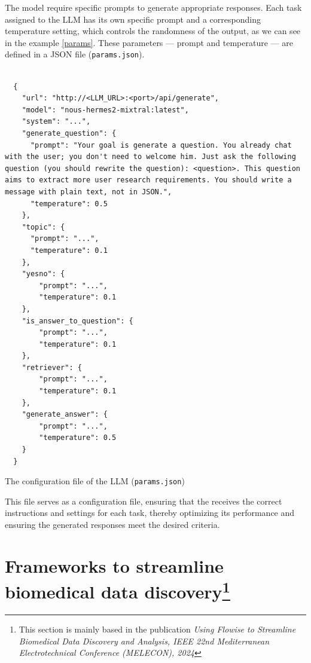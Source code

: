
The model require specific prompts to generate appropriate responses. Each task assigned to the LLM has its own specific prompt and a corresponding temperature setting, which controls the randomness of the output, as we can see in the example \ref{params}. These parameters — prompt and temperature — are defined in a JSON file {\small\normalfont(\texttt{params.json})}. 

\begin{listing}[H]
  \begin{verbatim}
      
  {
    "url": "http://<LLM_URL>:<port>/api/generate",
    "model": "nous-hermes2-mixtral:latest",
    "system": "...",
    "generate_question": {
      "prompt": "Your goal is generate a question. You already chat with the user; you don't need to welcome him. Just ask the following question (you should rewrite the question): <question>. This question aims to extract more user research requirements. You should write a message with plain text, not in JSON.",
      "temperature": 0.5
    },
    "topic": {
      "prompt": "...",
      "temperature": 0.1
    },
    "yesno": {
        "prompt": "...",
        "temperature": 0.1
    },
    "is_answer_to_question": {
        "prompt": "...",
        "temperature": 0.1
    },
    "retriever": {
        "prompt": "...",
        "temperature": 0.1
    },
    "generate_answer": {
        "prompt": "...",
        "temperature": 0.5
    }
  }
  \end{verbatim}
  \caption{The configuration file of the LLM {\small\normalfont(\texttt{params.json})}}
  \label{params}
\end{listing}

This file serves as a configuration file, ensuring that the {\llm} receives the correct instructions and settings for each task, thereby optimizing its performance and ensuring the generated responses meet the desired criteria.




\section{Frameworks to streamline biomedical data discovery\protect\footnote{This section is mainly based in the publication \textit{Using Flowise to Streamline Biomedical Data Discovery and Analysis, IEEE 22nd Mediterranean Electrotechnical Conference (MELECON), 2024}}}


